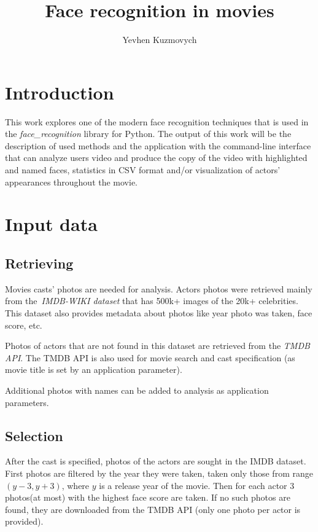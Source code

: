 \documentclass[hidelinks, english]{mvi-report}
\title{Face recognition in movies}
\author{Yevhen Kuzmovych}
\affiliation{ČVUT - FIT}
\begin{document}
    \maketitle

    \section{Introduction}
    This work explores one of the modern face recognition techniques that is used in
    the \textit{face\_recognition}\cite{face_recognition} library for Python. The output of this work will be
    the description of used methods and the application with the command-line interface that can analyze users video and
    produce the copy of the video with highlighted and named faces, statistics in CSV format and/or visualization of actors'
    appearances throughout the movie.

    \section{Input data}

    \subsection{Retrieving}
    Movies casts' photos are needed for analysis. Actors photos were retrieved mainly from
    the~\textit{IMDB-WIKI dataset}\cite{Rothe-IJCV-2016} that has 500k+ images of the 20k+ celebrities. This dataset also
    provides metadata about photos like year photo was taken, face score, etc.

    Photos of actors that are not found in this dataset are retrieved from the \textit{TMDB API}\cite{tmdb-api}.
    The TMDB API is also used for movie search and cast specification (as movie title is set by an application
    parameter).

    Additional photos with names can be added to analysis as application parameters.

    \subsection{Selection}
    After the cast is specified, photos of the actors are sought in the IMDB dataset. First photos are filtered by the year
    they were taken, taken only those from range \( (y-3, y+3) \), where \(y\) is a release year of the movie. Then for
    each actor 3 photos(at most) with the highest face score are taken. If no such photos are found, they are downloaded
    from the TMDB API (only one photo per actor is provided).
\end{document}
